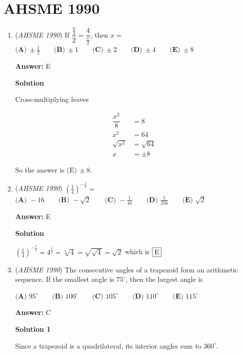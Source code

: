 \section{AHSME 1990}
        \begin{enumerate}
        	\item (\textit{AHSME 1990}) If $\dfrac{\frac{x}{4}}{2}=\dfrac{4}{\frac{x}{2}}$, then $x=$
$\textbf{(A)}\ \pm\frac{1}{2}\qquad\textbf{(B)}\ \pm 1\qquad\textbf{(C)}\ \pm 2\qquad\textbf{(D)}\ \pm 4\qquad\textbf{(E)}\ \pm 8$

 \textbf{Answer: }E



\textbf{Solution}

Cross-multiplying leaves 

 
 \begin{align*}\dfrac{x^2}{8} &= 8\\ x^2 &= 64\\ \sqrt{x^2} &= \sqrt{64}\\ x &= \pm 8\end{align*}


 So the answer is $\boxed{\text{(E)} \, \pm 8}$.

 


	\item (\textit{AHSME 1990}) $\left(\frac{1}{4}\right)^{-\frac{1}{4}}=$
$\textbf{(A) } -16\qquad \textbf{(B) } -\sqrt{2}\qquad \textbf{(C) } -\frac{1}{16}\qquad \textbf{(D) } \frac{1}{256}\qquad \textbf{(E) } \sqrt{2}$

 \textbf{Answer: }E



\textbf{Solution}

$\left(\frac14\right)^{-\frac14}=4^{\frac14}=\sqrt[4]4=\sqrt{\sqrt4}=\sqrt2$ which is $\fbox{E}$



	\item (\textit{AHSME 1990}) The consecutive angles of a trapezoid form an arithmetic sequence. If the smallest angle is $75^\circ$, then the largest angle is


 $\textbf{(A) } 95^\circ\qquad \textbf{(B) } 100^\circ\qquad \textbf{(C) } 105^\circ\qquad \textbf{(D) } 110^\circ\qquad \textbf{(E) } 115^\circ$

 \textbf{Answer: }C



\textbf{Solution 1}

Since a trapezoid is a quadrilateral, its interior angles sum to $360^\circ$.


\end{enumerate}
